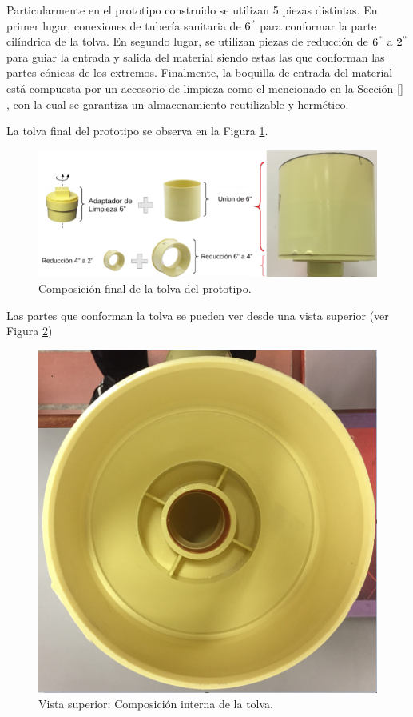 Particularmente en el prototipo construido se utilizan 5 piezas distintas. En primer lugar, conexiones de tubería sanitaria de $6^{"}$ para conformar la parte cilíndrica de la tolva. En segundo lugar, se utilizan piezas de reducción de $6^{"}$ a $2^{"}$ para guiar la entrada y salida del material siendo estas las que conforman las partes cónicas de los extremos. Finalmente, la boquilla de entrada del material está compuesta por un accesorio de limpieza como el mencionado en la Sección \ref{} , con la cual se garantiza un almacenamiento reutilizable y hermético.

La tolva final del prototipo se observa en la Figura  \ref{tolvares}.

\begin{figure}[H]
	\begin{center}
		\includegraphics[scale=0.8]{img/tolvares2.png}
	\end{center}
	\caption{Composición final de la tolva del prototipo. \label{tolvares}}
\end{figure}

Las partes que conforman la tolva se pueden ver desde una vista superior (ver Figura \ref{vissuptolva})

\begin{figure}[H]
	\begin{center}
		\includegraphics[scale=0.55]{img/vissuptolva2.png}
	\end{center}
	\caption{Vista superior: Composición interna de la tolva. \label{vissuptolva}}
\end{figure}

